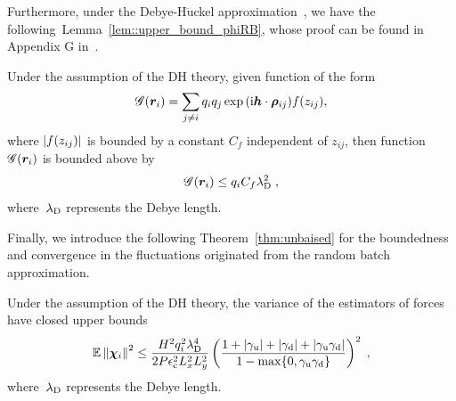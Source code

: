 Furthermore, under the Debye-H$\ddot{\text{u}}$ckel approximation~\cite{levin2002electrostatic}, we have  the following~Lemma~\ref{lem::upper_bound_phiRB}, whose proof can be found in Appendix G in~\cite{gan2024fast}.
\begin{lem} \label{lem::upper_bound_phiRB}
  Under the assumption of the DH theory, given function of the form 
    \begin{equation}
       \mathscr{G}(\boldsymbol{r}_i)=\sum_{j\neq i}q _i q_{j}\exp{(\mathrm{i} \boldsymbol{h} \cdot \boldsymbol{\rho}_{ij})}f(z_{ij}),
    \end{equation}
 where $\lvert f(z_{ij})\rvert$ is bounded by  a constant $C_f$ independent of $z_{ij}$, then function $ \mathscr{G}(\boldsymbol{r}_i)$ is bounded above by
    \begin{equation}
         \mathscr{G}(\boldsymbol{r}_i)\leq q_i  C_f\lambda_{\mathrm{D}}^2\;,
    \end{equation}
    where~$\lambda_{\mathrm{D}}$  represents the Debye length.
\end{lem}
Finally, we introduce the following Theorem~\ref{thm:unbaised} for the boundedness and convergence in the fluctuations originated from the random batch approximation.
\begin{thm}\label{thm:unbaised}
	Under the assumption of the DH theory,   the variance  of the estimators of   forces have closed upper bounds
	\begin{equation}
		  \mathbb{E}\left\lVert\boldsymbol{\chi}_{i}\right\rVert^2\leq\frac{ H^2q_i^2\lambda_{\mathrm{D}}^4}{2P\epsilon_{\mathrm{c}}^2 L_x^2L_y^2}\left( \frac{1+\left\lvert\gamma_{\mathrm{u}}\right\rvert+\left\lvert\gamma_{\mathrm{d}}\right\rvert+\left\lvert\gamma_{\mathrm{u}}\gamma_{\mathrm{d}}\right\rvert}{1-\max\{0,\gamma_{\mathrm{u}}\gamma_{\mathrm{d}}\}}\right)^2\;,
	\end{equation}
     where~$\lambda_{\mathrm{D}}$  represents the Debye length.
\end{thm}
